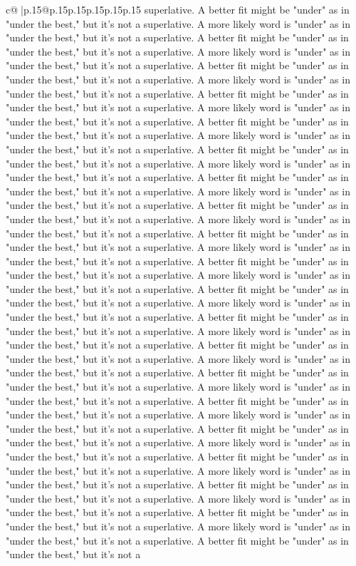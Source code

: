\documentclass{article}
\begin{document}
{\begin{supertabular}{c@{$\;$}|p{.15\linewidth}@{}p{.15\linewidth}p{.15\linewidth}p{.15\linewidth}p{.15\linewidth}p{.15\linewidth}}
{{{superlative. A better fit might be "under" as in "under the best," but it's not a superlative. A more likely word is "under" as in "under the best," but it's not a superlative. A better fit might be "under" as in "under the best," but it's not a superlative. A more likely word is "under" as in "under the best," but it's not a superlative. A better fit might be "under" as in "under the best," but it's not a superlative. A more likely word is "under" as in "under the best," but it's not a superlative. A better fit might be "under" as in "under the best," but it's not a superlative. A more likely word is "under" as in "under the best," but it's not a superlative. A better fit might be "under" as in "under the best," but it's not a superlative. A more likely word is "under" as in "under the best," but it's not a superlative. A better fit might be "under" as in "under the best," but it's not a superlative. A more likely word is "under" as in "under the best," but it's not a superlative. A better fit might be "under" as in "under the best," but it's not a superlative. A more likely word is "under" as in "under the best," but it's not a superlative. A better fit might be "under" as in "under the best," but it's not a superlative. A more likely word is "under" as in "under the best," but it's not a superlative. A better fit might be "under" as in "under the best," but it's not a superlative. A more likely word is "under" as in "under the best," but it's not a superlative. A better fit might be "under" as in "under the best," but it's not a superlative. A more likely word is "under" as in "under the best," but it's not a superlative. A better fit might be "under" as in "under the best," but it's not a superlative. A more likely word is "under" as in "under the best," but it's not a superlative. A better fit might be "under" as in "under the best," but it's not a superlative. A more likely word is "under" as in "under the best," but it's not a superlative. A better fit might be "under" as in "under the best," but it's not a superlative. A more likely word is "under" as in "under the best," but it's not a superlative. A better fit might be "under" as in "under the best," but it's not a superlative. A more likely word is "under" as in "under the best," but it's not a superlative. A better fit might be "under" as in "under the best," but it's not a superlative. A more likely word is "under" as in "under the best," but it's not a superlative. A better fit might be "under" as in "under the best," but it's not a superlative. A more likely word is "under" as in "under the best," but it's not a superlative. A better fit might be "under" as in "under the best," but it's not a superlative. A more likely word is "under" as in "under the best," but it's not a superlative. A better fit might be "under" as in "under the best," but it's not a superlative. A more likely word is "under" as in "under the best," but it's not a superlative. A better fit might be "under" as in "under the best," but it's not a superlative. A more likely word is "under" as in "under the best," but it's not a superlative. A better fit might be "under" as in "under the best," but it's not a }}}
\end{supertabular}}
\end{document}
